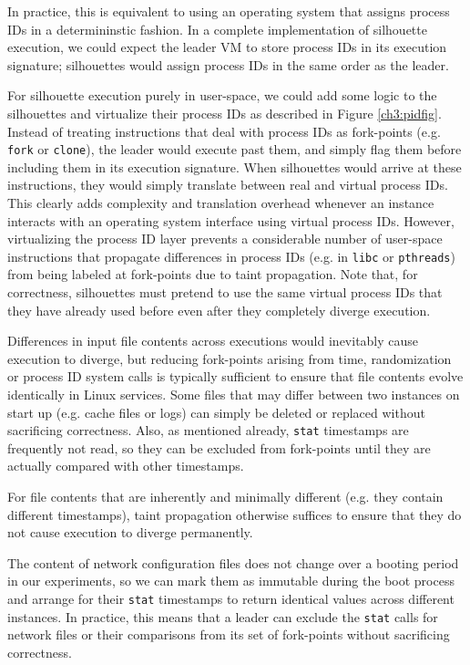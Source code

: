 In practice, this is equivalent
to using an operating system that assigns
process IDs in a determininstic fashion.
In a complete implementation of silhouette
execution, we could expect the leader VM
to store process IDs in its execution 
signature; silhouettes would assign process IDs
in the same order as the leader.

For silhouette execution purely in 
user-space, we could add some logic to the silhouettes 
and virtualize their process IDs as described
in Figure \ref{ch3:pidfig}.
Instead of treating instructions that deal with process IDs as 
fork-points (e.g. \texttt{fork} or \texttt{clone}), the leader
would execute past them, and simply flag them before
including them in its execution signature.
When silhouettes would arrive at these 
instructions, they would simply translate
between real and virtual process IDs.
This clearly adds complexity and translation overhead
whenever an instance interacts 
with an operating system interface using 
virtual process IDs. However, virtualizing
the process ID layer prevents
a considerable number of user-space instructions 
that propagate differences
in process IDs (e.g. in \texttt{libc} or \texttt{pthreads}) from being labeled at fork-points
due to taint propagation.
Note that,  for correctness, silhouettes
must pretend to use the same virtual process IDs
that they have already used before even after they completely 
diverge execution.\newline

 \newline
Differences in input file contents across
executions would inevitably cause execution
to diverge, but reducing fork-points arising
from time, randomization or process ID system calls
is typically sufficient to ensure that
file contents evolve identically in Linux services. 
Some files that may differ
between two instances on start up (e.g. 
cache files or logs) can simply be 
deleted or replaced without sacrificing correctness.
Also, as mentioned already, \texttt{stat} 
timestamps are frequently not read, so
they can be excluded from fork-points until
they are actually compared with
other timestamps.

For file contents that are inherently and minimally different
(e.g. they contain different timestamps),
taint propagation otherwise suffices to ensure that 
they do not cause execution to diverge permanently. \newline

 \newline
The content of network configuration files
does not change over a booting period in our experiments,
so we can mark them as immutable
during the boot process and
arrange for their \texttt{stat} timestamps
to return identical values across different
instances. In practice,
this means that a leader can 
exclude the \texttt{stat}
calls for network files
or their comparisons from its
set of fork-points without
sacrificing correctness.

